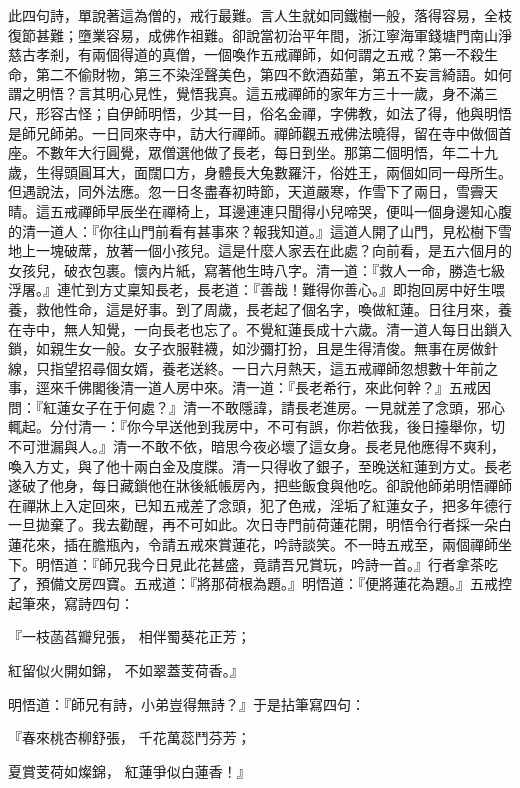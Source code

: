 此四句詩，單說著這為僧的，戒行最難。言人生就如同鐵樹一般，落得容易，全枝復節甚難；墮業容易，成佛作祖難。卻說當初治平年間，浙江寧海軍錢塘門南山淨慈古孝剎，有兩個得道的真僧，一個喚作五戒禪師，如何謂之五戒？第一不殺生命，第二不偷財物，第三不染淫聲美色，第四不飲酒茹葷，第五不妄言綺語。如何謂之明悟？言其明心見性，覺悟我真。這五戒禪師的家年方三十一歲，身不滿三尺，形容古怪；自伊師明悟，少其一目，俗名金禪，字佛教，如法了得，他與明悟是師兄師弟。一日同來寺中，訪大行禪師。禪師觀五戒佛法曉得，留在寺中做個首座。不數年大行圓覺，眾僧選他做了長老，每日到坐。那第二個明悟，年二十九歲，生得頭圓耳大，面闊口方，身體長大兔數羅汗，俗姓王，兩個如同一母所生。但遇說法，同外法應。忽一日冬盡春初時節，天道嚴寒，作雪下了兩日，雪霽天晴。這五戒禪師早辰坐在禪椅上，耳邊連連只聞得小兒啼哭，便叫一個身邊知心腹的清一道人：『你往山門前看有甚事來？報我知道。』這道人開了山門，見松樹下雪地上一塊破蓆，放著一個小孩兒。這是什麼人家丟在此處？向前看，是五六個月的女孩兒，破衣包裹。懷內片紙，寫著他生時八字。清一道：『救人一命，勝造七級浮屠。』連忙到方丈稟知長老，長老道：『善哉！難得你善心。』即抱回房中好生喂養，救他性命，這是好事。到了周歲，長老起了個名字，喚做紅蓮。日往月來，養在寺中，無人知覺，一向長老也忘了。不覺紅蓮長成十六歲。清一道人每日出鎖入鎖，如親生女一般。女子衣服鞋襪，如沙彌打扮，且是生得清俊。無事在房做針線，只指望招尋個女婿，養老送終。一日六月熱天，這五戒禪師忽想數十年前之事，逕來千佛閣後清一道人房中來。清一道：『長老希行，來此何幹？』五戒因問：『紅蓮女子在于何處？』清一不敢隱諱，請長老進房。一見就差了念頭，邪心輒起。分付清一：『你今早送他到我房中，不可有誤，你若依我，後日擡舉你，切不可泄漏與人。』清一不敢不依，暗思今夜必壞了這女身。長老見他應得不爽利，喚入方丈，與了他十兩白金及度牒。清一只得收了銀子，至晚送紅蓮到方丈。長老遂破了他身，每日藏鎖他在牀後紙帳房內，把些飯食與他吃。卻說他師弟明悟禪師在禪牀上入定回來，已知五戒差了念頭，犯了色戒，淫垢了紅蓮女子，把多年德行一旦拋棄了。我去勸醒，再不可如此。次日寺門前荷蓮花開，明悟令行者採一朵白蓮花來，插在膽瓶內，令請五戒來賞蓮花，吟詩談笑。不一時五戒至，兩個禪師坐下。明悟道：『師兄我今日見此花甚盛，竟請吾兄賞玩，吟詩一首。』行者拿茶吃了，預備文房四寶。五戒道：『將那荷根為題。』明悟道：『便將蓮花為題。』五戒控起筆來，寫詩四句：

『一枝菡萏瓣兒張，  相伴蜀葵花正芳；

紅留似火開如錦，  不如翠蓋芰荷香。』

明悟道：『師兄有詩，小弟豈得無詩？』于是拈筆寫四句：

『春來桃杏柳舒張，  千花萬蕊鬥芬芳；

夏賞芰荷如燦錦，  紅蓮爭似白蓮香！』

